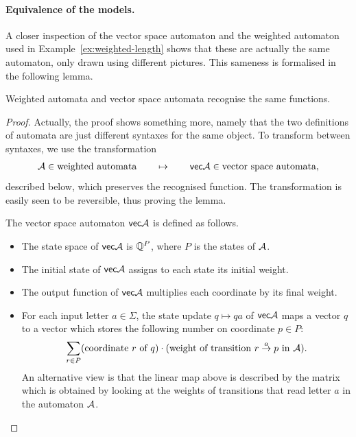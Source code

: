 \paragraph*{Equivalence of the models.} A closer inspection of the vector space automaton and the weighted automaton used in Example~\ref{ex:weighted-length} shows that these are actually the same automaton, only drawn using different pictures. This sameness is formalised in the following lemma.
\begin{lemma}\label{lem:}
	Weighted automata and vector space automata recognise the same functions.
\end{lemma}
\begin{proof} 
Actually, the proof shows something more, namely that the two definitions of automata are just different syntaxes for the same object. 
To transform between syntaxes, we use the  transformation
\begin{align*}
  \mathcal{A} \in \text{weighted automata} \qquad \mapsto \qquad \mathsf{vec}\mathcal{A} \in \text{vector space automata},
\end{align*}
described below, 
which preserves the recognised function. The transformation  is easily seen to be reversible, thus proving the lemma. 

The vector space automaton $\mathsf{vec}\mathcal{A}$ is defined as follows.
\begin{itemize}
	\item The state space of $\mathsf{vec}\mathcal{A}$ is  $\mathbb Q^P$, where $P$ is the states of $\mathcal{A}$.
	\item The initial state of $\mathsf{vec}\mathcal{A}$  assigns to each state its initial weight.
	\item The output function of $\mathsf{vec}\mathcal{A}$ multiplies each coordinate by its final weight.
	\item For each input letter $a \in \Sigma$,  the state update $q \mapsto qa$ of  $\mathsf{vec}\mathcal{A}$   maps a vector $q$ to a vector which stores the following number on coordinate $p \in P$:
  \begin{align*}
 \sum_{r \in P} (\text{coordinate $r$ of $q$}) \cdot (\text{weight of transition $r \stackrel a \to p$ in $\mathcal{A}$}).
\end{align*}
An alternative view is that the linear map above is described by the matrix which is obtained by looking at the weights of transitions that read letter $a$ in the automaton $\mathcal{A}$.

\end{itemize}
 \end{proof}

